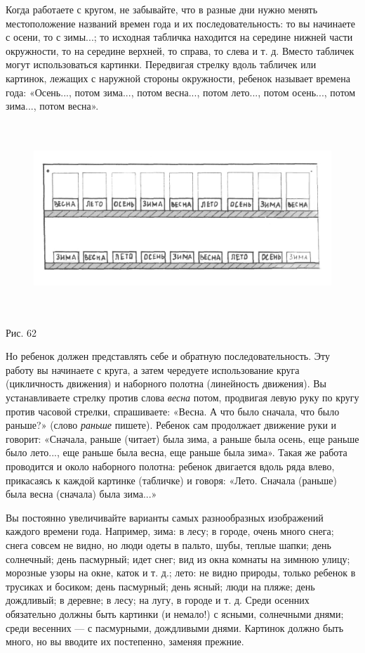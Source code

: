 \documentclass[a5paper]{book}
\renewcommand{\emph}[1]{\textit{#1}}
\begin{document}
Когда работаете с кругом, не забывайте, что в разные дни нужно менять
местоположение названий времен года и их последовательность: то вы
начинаете с осени, то с зимы...; то исходная табличка находится на
середине нижней части окружности, то на середине верхней, то справа, то
слева и т. д. Вместо табличек могут использоваться картинки. Передвигая
стрелку вдоль табличек или картинок, лежащих с наружной стороны
окружности, ребенок называет времена года: «Осень..., потом зима...,
потом весна..., потом лето..., потом осень..., потом зима..., потом
весна».

\begin{figure}
\centering
\includegraphics[width=6.21421in,height=2.81563in]{media/media/image59.jpg}
\end{figure}

Рис. 62

Но ребенок должен представлять себе и обратную последовательность. Эту
работу вы начинаете с круга, а затем чередуете использование круга
(цикличность движения) и наборного полотна (линейность движения). Вы
устанавливаете стрелку против слова \emph{весна} потом, продвигая левую
руку по кругу против часовой стрелки, спрашиваете: «Весна. А что было
сначала, что было раньше?» (слово \emph{раньше} пишете). Ребенок сам
продолжает движение руки и говорит: «Сначала, раньше (читает) была зима,
а раньше была осень, еще раньше было лето..., еще раньше была весна, еще
раньше была зима». Такая же работа проводится и около наборного полотна:
ребенок двигается вдоль ряда влево, прикасаясь к каждой картинке
(табличке) и говоря: «Лето. Сначала (раньше) была весна (сначала) была
зима...»

Вы постоянно увеличивайте варианты самых разнообразных изображений
каждого времени года. Например, зима: в лесу; в городе, очень много
снега; снега совсем не видно, но люди одеты в пальто, шубы, теплые
шапки; день солнечный; день пасмурный; идет снег; вид из окна комнаты на
зимнюю улицу; морозные узоры на окне, каток и т. д.; лето: не видно
природы, только ребенок в трусиках и босиком; день пасмурный; день
ясный; люди на пляже; день дождливый; в деревне; в лесу; на лугу, в
городе и т. д. Среди осенних обязательно должны быть картинки (и
немало!) с ясными, солнечными днями; среди весенних --- с пасмурными,
дождливыми днями. Картинок должно быть много, но вы вводите их
постепенно, заменяя прежние.
\end{document}

